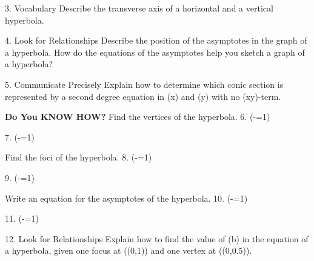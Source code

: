 \documentclass{article}
\newenvironment{concept-summary}{}{}    %
\newcommand{\answer}[1]{}               %
\begin{document}
\begin{concept-summary}
\answer{While one side of a hyperbola appears to have the same shape as a parabola, the relationships that define the points on a hyperbola are different from those that define the points on a parabola.}
3. Vocabulary Describe the transverse axis of a horizontal and a vertical hyperbola.
\answer{The line that goes from one vertex to the other vertex, through the center, is the transverse axis.}
4. Look for Relationships Describe the position of the asymptotes in the graph of a hyperbola. How do the equations of the asymptotes help you sketch a graph of a hyperbola?
\answer{The asymptotes are lines that have opposite slopes and intersect at the center of the hyperbola. The graph of a hyperbola approaches, but never intersects, the asymptotes. By drawing the asymptotes on a graph, you can use them as guidelines to sketch the hyperbola, making sure the hyperbola approaches, but never intersects, the asymptotes.}
5. Communicate Precisely Explain how to determine which conic section is represented by a second degree equation in (x) and (y) with no (xy)-term.
\answer{If there is no (x^2)- or (y^2)-term, solve for (x) or (y). If the coefficients of (x^2) and (y^2) are both not equal to 0, complete the square in each variable and divide by the LCM of the (x^2) and (y^2) terms. Compare the result to the standard form of a circle, ellipse, or hyperbola.}
\textbf{Do You KNOW HOW?}
Find the vertices of the hyperbola.
6. (-=1)
\answer{((0,12)) and ((0,-12))}
7. (-=1)
\answer{((11,0)) and ((-11,0))}
Find the foci of the hyperbola.
8. (-=1)
\answer{((10,0)) and ((-10,0))}
9. (-=1)
\answer{((0,5)) and ((0,-5))}
Write an equation for the asymptotes of the hyperbola.
10. (-=1)
\answer{(y=\pm\frac{10}{3}x)}
11. (-=1)
\answer{(y=\pm\frac{1}{3}x)}
12. Look for Relationships Explain how to find the value of (b) in the equation of a hyperbola, given one focus at ((0,1)) and one vertex at ((0,0.5)).
\answer{A focus at ((0,1)) means the value of (c) is 1, so (c^2=1). A vertex at ((0,0.5)) means the value of (a) is 0.5, so (a^2=0.25). Use the equation (a^2+b^2=c^2) to find the value of (b): (0.25+b^2=1), so (b^2=0.75) and (b=\sqrt{0.75}).}
\end{concept-summary}
\end{document}
